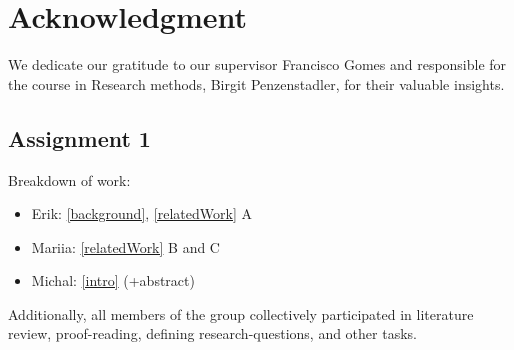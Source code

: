\documentclass[conference]{IEEEtran}
\begin{document}


\section*{Acknowledgment}

We dedicate our gratitude to our supervisor Francisco Gomes and responsible for the course in Research methods, Birgit Penzenstadler, for their valuable insights.

\subsection{Assignment 1}

Breakdown of work:
\begin{itemize}
    \item Erik: \ref{background}, \ref{relatedWork} A
    \item Mariia: \ref{relatedWork} B and C
    \item Michal: \ref{intro} (+abstract)
\end{itemize}

Additionally, all members of the group collectively participated in literature
review, proof-reading, defining research-questions, and other tasks.




\end{document}
